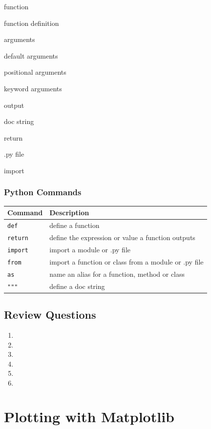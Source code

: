 \documentclass{book}
\begin{document}
function

function definition

arguments

default arguments

positional arguments

keyword arguments

output

doc string

return

.py file

import

\subsection{Python Commands}\label{python-commands}

\begin{longtable}[]{@{}ll@{}}
\toprule
Command & Description\tabularnewline
\midrule
\endhead
\lstinline!def! & define a function\tabularnewline
\lstinline!return! & define the expression or value a function
outputs\tabularnewline
\lstinline!import! & import a module or .py file\tabularnewline
\lstinline!from! & import a function or class from a module or .py
file\tabularnewline
\lstinline!as! & name an alias for a function, method or
class\tabularnewline
\lstinline!"""! & define a doc string\tabularnewline
\bottomrule
\end{longtable}
    




    
        \section{Review Questions}\label{review-questions}
    




    
        \begin{enumerate}
\def\labelenumi{\arabic{enumi}.}
\item
\item
\item
\item
\item
\item
\end{enumerate}
    




    
        \chapter{Plotting with Matplotlib}\label{plotting-with-matplotlib}
    
\end{document}
